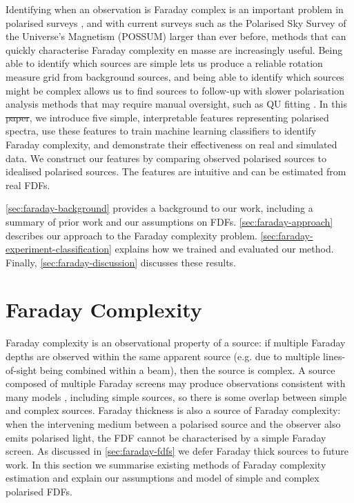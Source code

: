 \documentclass[11pt, a4paper]{book}
\providecommand{\DIFaddtex}[1]{{\protect\color{blue}\uwave{#1}}} %
\providecommand{\DIFdeltex}[1]{{\protect\color{red}\sout{#1}}}                      %
\providecommand{\DIFaddbegin}{} %
\providecommand{\DIFaddend}{} %
\providecommand{\DIFdelbegin}{} %
\providecommand{\DIFdelend}{} %
\providecommand{\DIFadd}[1]{\texorpdfstring{\DIFaddtex{#1}}{#1}} %
\providecommand{\DIFdel}[1]{\texorpdfstring{\DIFdeltex{#1}}{}} %
\newcommand{\DIFscaledelfig}{0.5}
\newlength{\DIFdelgraphicswidth} %
\newlength{\DIFdelgraphicsheight} %
\newcommand{\DIFaddincludegraphics}[2][]{{\color{blue}\fbox{\DIFOincludegraphics[#1]{#2}}}} %
\newcommand{\DIFdelincludegraphics}[2][]{%
\sbox{\DIFdelgraphicsbox}{\DIFOincludegraphics[#1]{#2}}%
\settoboxwidth{\DIFdelgraphicswidth}{\DIFdelgraphicsbox} %
\settoboxtotalheight{\DIFdelgraphicsheight}{\DIFdelgraphicsbox} %
\scalebox{\DIFscaledelfig}{%
\parbox[b]{\DIFdelgraphicswidth}{\usebox{\DIFdelgraphicsbox}\\[-\baselineskip] \rule{\DIFdelgraphicswidth}{0em}}\llap{\resizebox{\DIFdelgraphicswidth}{\DIFdelgraphicsheight}{%
\setlength{\unitlength}{\DIFdelgraphicswidth}%
\begin{picture}(1,1)%
\thicklines\linethickness{2pt} %
{\color[rgb]{1,0,0}\put(0,0){\framebox(1,1){}}}%
{\color[rgb]{1,0,0}\put(0,0){\line( 1,1){1}}}%
{\color[rgb]{1,0,0}\put(0,1){\line(1,-1){1}}}%
\end{picture}%
}\hspace*{3pt}}} %
} %
\DeclareRobustCommand{\DIFaddbegin}{\DIFOaddbegin \let\includegraphics\DIFaddincludegraphics} %
\DeclareRobustCommand{\DIFaddend}{\DIFOaddend \let\includegraphics\DIFOincludegraphics} %
\DeclareRobustCommand{\DIFdelbegin}{\DIFOdelbegin \let\includegraphics\DIFdelincludegraphics} %
\DeclareRobustCommand{\DIFdelend}{\DIFOaddend \let\includegraphics\DIFOincludegraphics} %
\begin{document}
  Identifying when an observation is Faraday complex is an important problem in polarised surveys \citep{sun15comparison}, and with current surveys such as the Polarised Sky Survey of the Universe's Magnetism (POSSUM) larger than ever before, methods that can quickly characterise Faraday complexity en masse are increasingly useful. Being able to identify which sources are simple lets us produce a reliable rotation measure grid from background sources, and being able to identify which sources might be complex allows us to find sources to follow-up with slower polarisation analysis methods that may require manual oversight, such as QU fitting \citep[as seen in e.g.][]{miyashita19qu,osullivan_broad-band_2017}. In this \DIFdelbegin \DIFdel{paper}\DIFdelend \DIFaddbegin \DIFadd{chapter}\DIFaddend , we introduce five simple, interpretable features representing polarised spectra, use these features to train machine learning classifiers to identify Faraday complexity, and demonstrate their effectiveness on real and simulated data. We construct our features by comparing observed polarised sources to idealised polarised sources. The features are intuitive and can be estimated from real FDFs.

  \autoref{sec:faraday-background} provides a background to our work, including a summary of prior work and our assumptions on FDFs. \autoref{sec:faraday-approach} describes our approach to the Faraday complexity problem. \autoref{sec:faraday-experiment-classification} explains how we trained and evaluated our method. Finally, \autoref{sec:faraday-discussion} discusses these results.

\section{Faraday Complexity}
\label{sec:faraday-background}

    Faraday complexity is an observational property of a source: if multiple Faraday depths are observed within the same apparent source (e.g. due to multiple lines-of-sight being combined within a beam), then the source is complex. A source composed of multiple Faraday screens may produce observations consistent with many models \citep{sun15comparison}, including simple sources, so there is some overlap between simple and complex sources. Faraday thickness is also a source of Faraday complexity: when the intervening medium between a polarised source and the observer also emits polarised light, the FDF cannot be characterised by a simple Faraday screen. As discussed in \autoref{sec:faraday-fdfs} we defer Faraday thick sources to future work. In this section we summarise existing methods of Faraday complexity estimation and explain our assumptions and model of simple and complex polarised FDFs.
\end{document}
